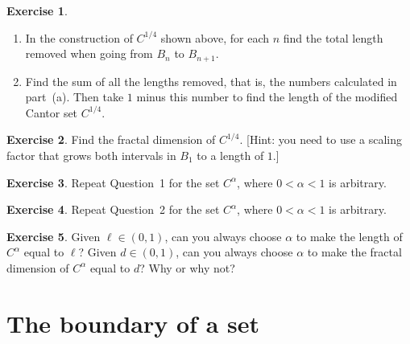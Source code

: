 \documentclass[11pt,oneside]{amsbook}
\theoremstyle{definition}
\newtheorem{exerc}{Exercise}[section]
\theoremstyle{plain}
\theoremstyle{definition}
\theoremstyle{remark}
\numberwithin{equation}{section}
\numberwithin{figure}{section}
\begin{document}
\begin{center}
\end{center}

\begin{exerc}
  \begin{enumerate}
    \item In the construction of $C^{1/4}$ shown above, for each $n$ find the total length removed when going from $B_n$ to $B_{n+1}$.
    \item Find the sum of all the lengths removed, that is, the numbers calculated in part~(a). Then take $1$ minus this number to find the length of the modified Cantor set $C^{1/4}$.
  \end{enumerate}
\end{exerc}

\begin{exerc}
  Find the fractal dimension of $C^{1/4}$. [Hint: you need to use a scaling factor that grows both intervals in $B_1$ to a length of $1$.]
\end{exerc}

\begin{exerc}
  Repeat Question~1 for the set $C^\alpha$, where $0<\alpha<1$ is arbitrary.
\end{exerc}

\begin{exerc}
  Repeat Question~2 for the set $C^\alpha$, where $0<\alpha<1$ is arbitrary.
\end{exerc}

\begin{exerc}
  Given $\ell\in(0,1)$, can you always choose $\alpha$ to make the length of $C^\alpha$ equal to $\ell$? Given $d\in(0,1)$, can you always choose $\alpha$ to make the fractal dimension of $C^\alpha$ equal to $d$? Why or why not?
\end{exerc}

\newpage
\section{The boundary of a set}
\end{document}
